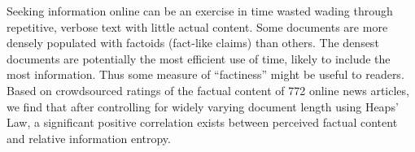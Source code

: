 Seeking information online can be an exercise in time wasted wading through repetitive, verbose text with little actual content. Some documents are more densely populated with factoids (fact-like claims) than others. The densest documents are potentially the most efficient use of time, likely to include the most information. Thus some measure of ``factiness'' might be useful to readers. Based on crowdsourced ratings of the factual content of 772 online news articles, we find that after controlling for widely varying document length using Heaps' Law, a significant positive correlation exists between perceived factual content and relative information entropy.
